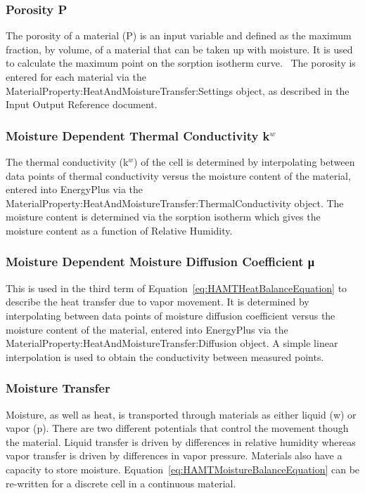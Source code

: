 \subsubsection{Porosity P}\label{porosity-p}

The porosity of a material (P) is an input variable and defined as the maximum fraction, by volume, of a material that can be taken up with moisture. It is used to calculate the maximum point on the sorption isotherm curve. ~The porosity is entered for each material via the MaterialProperty:HeatAndMoistureTransfer:Settings object, as described in the Input Output Reference document.

\subsubsection{Moisture Dependent Thermal Conductivity k\(^{w}\)}\label{moisture-dependent-thermal-conductivity-kw}

The thermal conductivity (k\(^{w}\)) of the cell is determined by interpolating between data points of thermal conductivity versus the moisture content of the material, entered into EnergyPlus via the MaterialProperty:HeatAndMoistureTransfer:ThermalConductivity object. The moisture content is determined via the sorption isotherm which gives the moisture content as a function of Relative Humidity.

\subsubsection{Moisture Dependent Moisture Diffusion Coefficient μ}\label{moisture-dependent-moisture-diffusion-coefficient-ux3bc}

This is used in the third term of Equation~\ref{eq:HAMTHeatBalanceEquation} to describe the heat transfer due to vapor movement. It is determined by interpolating between data points of moisture diffusion coefficient versus the moisture content of the material, entered into EnergyPlus via the MaterialProperty:HeatAndMoistureTransfer:Diffusion object. A simple linear interpolation is used to obtain the conductivity between measured points.

\subsubsection{Moisture Transfer}\label{moisture-transfer}

Moisture, as well as heat, is transported through materials as either liquid (w) or vapor (p). There are two different potentials that control the movement though the material. Liquid transfer is driven by differences in relative humidity whereas vapor transfer is driven by differences in vapor pressure. Materials also have a capacity to store moisture. Equation~\ref{eq:HAMTMoistureBalanceEquation} can be re-written for a discrete cell in a continuous material.

